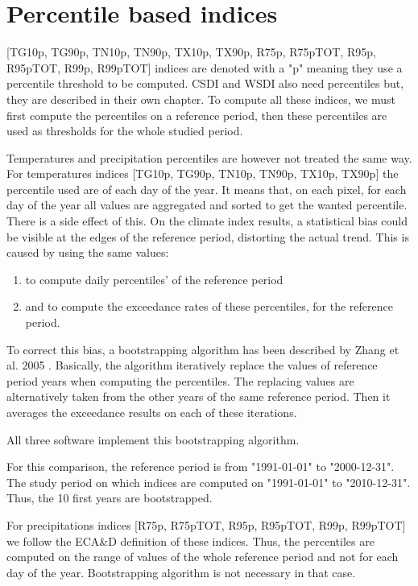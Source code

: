\documentclass[a4paper,11pt]{article}
\begin{document}
    \section{Percentile based indices}
        [TG10p, TG90p, TN10p, TN90p, TX10p, TX90p, R75p, R75pTOT, R95p, R95pTOT, R99p, R99pTOT] indices are denoted with a "p" meaning they use a percentile threshold to be computed. CSDI and WSDI also need percentiles but, they are described in their own chapter.
        To compute all these indices, we must first compute the percentiles on a reference period, then these percentiles are used as thresholds for the whole studied period.

        Temperatures and precipitation percentiles are however not treated the same way. 
        For temperatures indices [TG10p, TG90p, TN10p, TN90p, TX10p, TX90p] the percentile used are of each day of the year. It means that, on each pixel, for each day of the year all values are aggregated and sorted to get the wanted percentile. 
        There is a side effect of this. On the climate index results, a statistical bias could be visible at the edges of the reference period, distorting the actual trend.
        This is caused by using the same values:
        \begin{enumerate}
            \item to compute daily percentiles' of the reference period
            \item and to compute the exceedance rates of these percentiles, for the reference period.
        \end{enumerate}
        To correct this bias, a bootstrapping algorithm has been described by Zhang et al. 2005 \cite{quote/zhang_et_al}.
        Basically, the algorithm iteratively replace the values of reference period years when computing the percentiles.
        The replacing values are alternatively taken from the other years of the same reference period.
        Then it averages the exceedance results on each of these iterations.

        All three software implement this bootstrapping algorithm.

        For this comparison, the reference period is from "1991-01-01" to "2000-12-31".
        The study period on which indices are computed on "1991-01-01" to "2010-12-31".
        Thus, the 10 first years are bootstrapped.

        For precipitations indices [R75p, R75pTOT, R95p, R95pTOT, R99p, R99pTOT] we follow the ECA\&D definition of these indices.
        Thus, the percentiles are computed on the range of values of the whole reference period and not for each day of the year.
        Bootstrapping algorithm is not necessary in that case.
\end{document}
